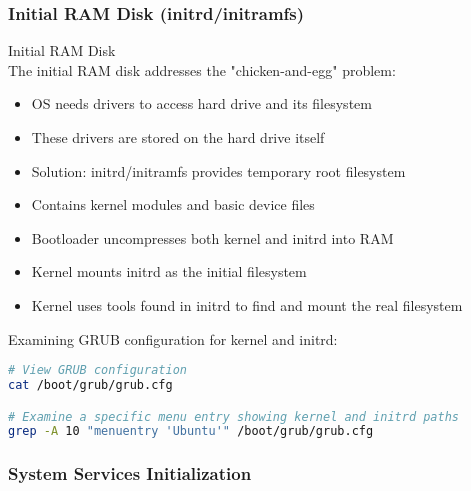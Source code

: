 \multend

\subsubsection{Initial RAM Disk (initrd/initramfs)}

\begin{definition}{Initial RAM Disk}\\
    The initial RAM disk addresses the "chicken-and-egg" problem:
    \begin{itemize}
        \item OS needs drivers to access hard drive and its filesystem
        \item These drivers are stored on the hard drive itself
        \item Solution: initrd/initramfs provides temporary root filesystem
        \item Contains kernel modules and basic device files
        \item Bootloader uncompresses both kernel and initrd into RAM
        \item Kernel mounts initrd as the initial filesystem
        \item Kernel uses tools found in initrd to find and mount the real filesystem
    \end{itemize}
\end{definition}

\begin{example}
    Examining GRUB configuration for kernel and initrd:
\begin{lstlisting}[language=bash, style=basesmol]
# View GRUB configuration
cat /boot/grub/grub.cfg

# Examine a specific menu entry showing kernel and initrd paths
grep -A 10 "menuentry 'Ubuntu'" /boot/grub/grub.cfg
\end{lstlisting}
\end{example}

\subsubsection{System Services Initialization}



